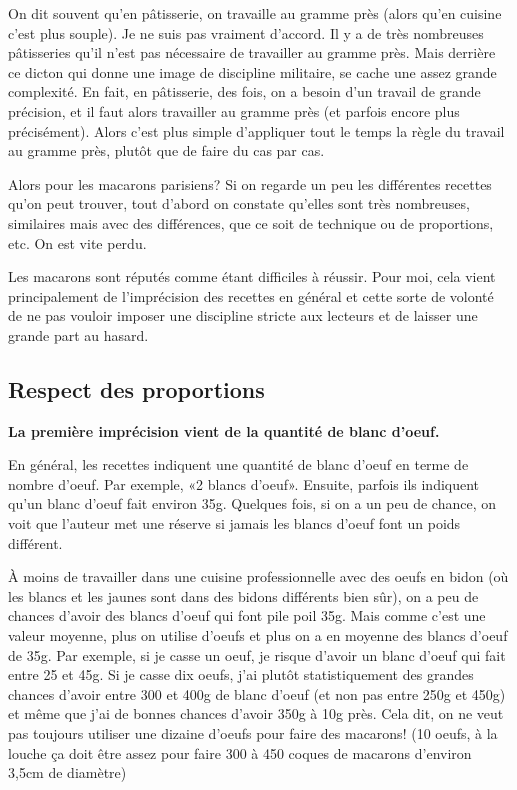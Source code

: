 \documentclass[a4paper]{article}
\newcommand{\guillemets}[1]{«#1»}
\begin{document}
On dit  souvent qu'en pâtisserie,  on travaille au gramme  près (alors
qu'en cuisine c'est  plus souple).  Je ne suis  pas vraiment d'accord.
Il y  a de très nombreuses  pâtisseries qu'il n'est  pas nécessaire de
travailler au gramme près. Mais derrière ce dicton qui donne une image
de  discipline militaire, se  cache une  assez grande  complexité.  En
fait,  en pâtisserie, des  fois, on  a besoin  d'un travail  de grande
précision,  et il  faut alors  travailler au  gramme près  (et parfois
encore plus précisément). Alors  c'est plus simple d'appliquer tout le
temps la règle  du travail au gramme près, plutôt que  de faire du cas
par cas. 

Alors  pour  les  macarons  parisiens?   Si  on  regarde  un  peu  les
différentes  recettes qu'on  peut  trouver, tout  d'abord on  constate
qu'elles sont  très nombreuses, similaires mais  avec des différences,
que ce soit de technique ou de proportions, etc. On est vite perdu.

Les macarons sont réputés comme  étant difficiles à réussir. Pour moi,
cela vient principalement de  l'imprécision des recettes en général et
cette  sorte de  volonté  de  ne pas  vouloir  imposer une  discipline
stricte aux lecteurs et de laisser une grande part au hasard.


\subsection{Respect des proportions}

\textbf{La première imprécision vient de la quantité de blanc d'oeuf.}  

En général,  les recettes  indiquent une quantité  de blanc  d'oeuf en
terme   de   nombre   d'oeuf.   Par  exemple,   \guillemets{2   blancs
  d'oeuf}.  Ensuite, parfois  ils  indiquent qu'un  blanc d'oeuf  fait
environ 35g.  Quelques fois,  si on a  un peu  de chance, on  voit que
l'auteur met  une réserve  si jamais les  blancs d'oeuf font  un poids
différent.

À moins de travailler dans  une cuisine professionnelle avec des oeufs
en bidon (où les blancs et  les jaunes sont dans des bidons différents
bien sûr), on a peu de chances d'avoir des blancs d'oeuf qui font pile
poil 35g. Mais comme c'est une valeur moyenne, plus on utilise d'oeufs
et plus on a en moyenne des  blancs d'oeuf de 35g.  Par exemple, si je
casse un oeuf, je risque d'avoir  un blanc d'oeuf qui fait entre 25 et
45g. Si  je casse dix  oeufs, j'ai plutôt statistiquement  des grandes
chances d'avoir  entre 300 et 400g  de blanc d'oeuf (et  non pas entre
250g et  450g) et même que j'ai  de bonnes chances d'avoir  350g à 10g
près. Cela dit, on ne veut pas toujours utiliser une dizaine d'oeufs 
pour faire des macarons! (10 oeufs, à la louche ça doit être assez
pour faire 300 à 450 coques de macarons d'environ 3,5cm de diamètre)
\end{document}
